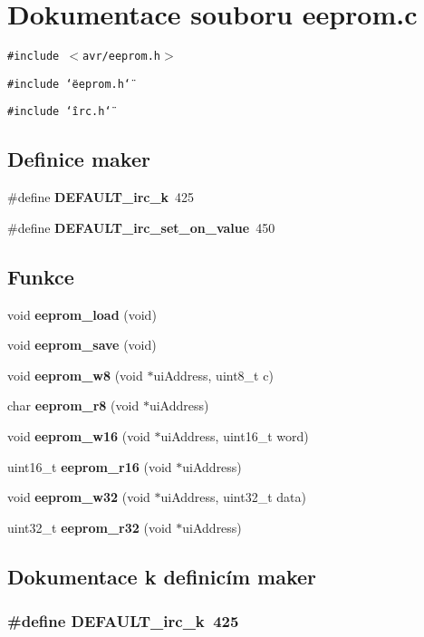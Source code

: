 \section{Dokumentace souboru eeprom.c}
\label{eeprom_8c}
{\tt \#include $<$avr/eeprom.h$>$}\par
{\tt \#include \char`\"{}eeprom.h\char`\"{}}\par
{\tt \#include \char`\"{}irc.h\char`\"{}}\par
\subsection*{Definice maker}
\begin{CompactItemize}
\item 
\#define {\bf DEFAULT\_\-irc\_\-k}~425
\item 
\#define {\bf DEFAULT\_\-irc\_\-set\_\-on\_\-value}~450
\end{CompactItemize}
\subsection*{Funkce}
\begin{CompactItemize}
\item 
void {\bf eeprom\_\-load} (void)
\item 
void {\bf eeprom\_\-save} (void)
\item 
void {\bf eeprom\_\-w8} (void $\ast$uiAddress, uint8\_\-t c)
\item 
char {\bf eeprom\_\-r8} (void $\ast$uiAddress)
\item 
void {\bf eeprom\_\-w16} (void $\ast$uiAddress, uint16\_\-t word)
\item 
uint16\_\-t {\bf eeprom\_\-r16} (void $\ast$uiAddress)
\item 
void {\bf eeprom\_\-w32} (void $\ast$uiAddress, uint32\_\-t data)
\item 
uint32\_\-t {\bf eeprom\_\-r32} (void $\ast$uiAddress)
\end{CompactItemize}


\subsection{Dokumentace k definicím maker}
\subsubsection{\setlength{\rightskip}{0pt plus 5cm}\#define DEFAULT\_\-irc\_\-k~425}\label{eeprom_8c_3fbd02c4db4c71e63711f57388545958}


